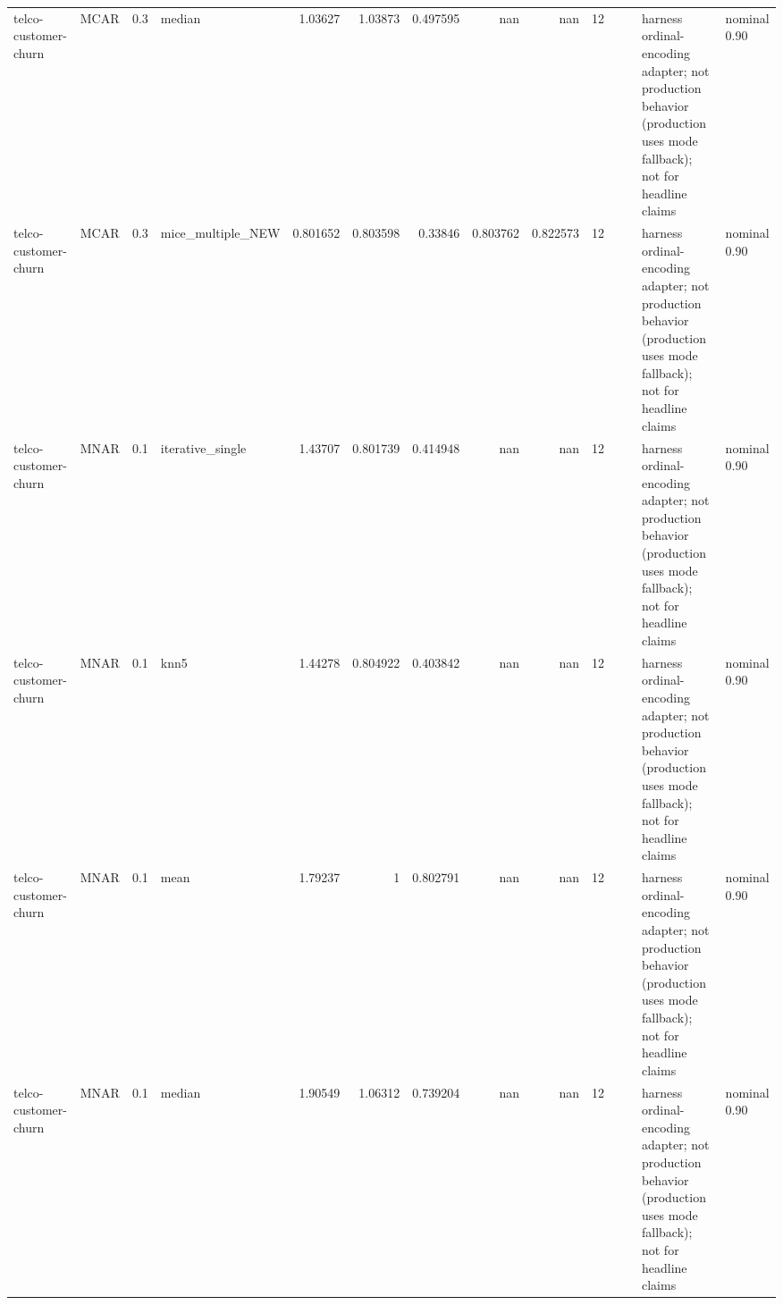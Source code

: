 \begin{table}[ht]
\begin{tabular}{llrlrrrrrrllll}
 telco-customer-churn & MCAR        &         0.3 & median            &       1.03627  &             1.03873  &                 0.497595 &                     nan        &                       nan        &        12 &                    &                                         & harness ordinal-encoding adapter; not production behavior (production uses mode fallback); not for headline claims & nominal 0.90              \\
 telco-customer-churn & MCAR        &         0.3 & mice\_multiple\_NEW &       0.801652 &             0.803598 &                 0.33846  &                       0.803762 &                         0.822573 &        12 &                    &                                         & harness ordinal-encoding adapter; not production behavior (production uses mode fallback); not for headline claims & nominal 0.90              \\
 telco-customer-churn & MNAR        &         0.1 & iterative\_single  &       1.43707  &             0.801739 &                 0.414948 &                     nan        &                       nan        &        12 &                    &                                         & harness ordinal-encoding adapter; not production behavior (production uses mode fallback); not for headline claims & nominal 0.90              \\
 telco-customer-churn & MNAR        &         0.1 & knn5              &       1.44278  &             0.804922 &                 0.403842 &                     nan        &                       nan        &        12 &                    &                                         & harness ordinal-encoding adapter; not production behavior (production uses mode fallback); not for headline claims & nominal 0.90              \\
 telco-customer-churn & MNAR        &         0.1 & mean              &       1.79237  &             1        &                 0.802791 &                     nan        &                       nan        &        12 &                    &                                         & harness ordinal-encoding adapter; not production behavior (production uses mode fallback); not for headline claims & nominal 0.90              \\
 telco-customer-churn & MNAR        &         0.1 & median            &       1.90549  &             1.06312  &                 0.739204 &                     nan        &                       nan        &        12 &                    &                                         & harness ordinal-encoding adapter; not production behavior (production uses mode fallback); not for headline claims & nominal 0.90              \\

\end{tabular}
\end{table}
